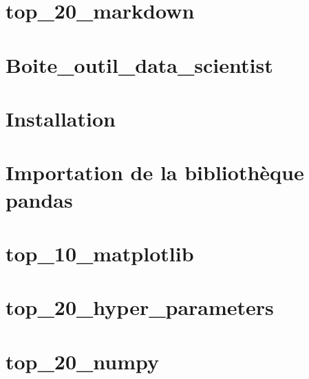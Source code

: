 \documentclass[twoside]{book}
\newcommand{\+}{\discretionary{\mbox{\scriptsize$\hookleftarrow$}}{}{}}
\begin{document}
\chapter{top\+\_\+20\+\_\+markdown}
\label{md_base_connaissances_ide_top_20_markdown}

\chapter{Boite\+\_\+outil\+\_\+data\+\_\+scientist}
\label{md_base_connaissances_machine_learning_Boite_outil_data_scientist}

\chapter{Installation}
\label{md_base_connaissances_machine_learning_top20_MongoDB}

\chapter{Importation de la bibliothèque pandas}
\label{md_base_connaissances_machine_learning_top_10_filtres_df}

\chapter{top\+\_\+10\+\_\+matplotlib}
\label{md_base_connaissances_machine_learning_top_10_matplotlib}

\chapter{top\+\_\+20\+\_\+hyper\+\_\+parameters}
\label{md_base_connaissances_machine_learning_top_20_hyper_parameters}

\chapter{top\+\_\+20\+\_\+numpy}
\label{md_base_connaissances_machine_learning_top_20_numpy}

\end{document}
